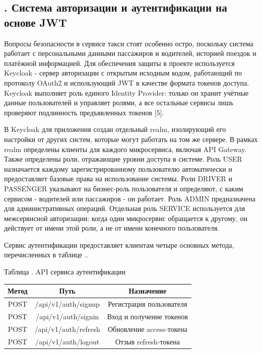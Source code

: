 \subtitlespace

\subsection*{
  \gostTitleFont
  \redline
  \thechaptercntr .\thesubchaptercntr \spc
  Система авторизации и аутентификации на основе JWT
} \addtocounter{subchaptercntr}{1}

\subtitlespace

{\gostFont

  \par \redline Вопросы безопасности в сервисе такси стоят особенно остро, поскольку система работает с персональными данными пассажиров и водителей, историей поездок и платёжной информацией. Для обеспечения защиты в проекте используется Keycloak - сервер авторизации с открытым исходным кодом, работающий по протоколу OAuth2 и использующий JWT в качестве формата токенов доступа. Keycloak выполняет роль единого Identity Provider: только он хранит учётные данные пользователей и управляет ролями, а все остальные сервисы лишь проверяют подлинность предъявленных токенов [5].

  \par \redline В Keycloak для приложения создан отдельный realm, изолирующий его настройки от других систем, которые могут работать на том же сервере. В рамках realm определены клиенты для каждого микросервиса, включая API Gateway. Также определены роли, отражающие уровни доступа в системе. Роль USER назначается каждому зарегистрированному пользователю автоматически и предоставляет базовые права на использование системы. Роли DRIVER и PASSENGER указывают на бизнес-роль пользователя и определяют, с каким сервисом - водителей или пассажиров - он работает. Роль ADMIN предназначена для административных операций. Отдельная роль SERVICE используется для межсервисной авторизации: когда один микросервис обращается к другому, он действует от имени этой роли, а не от имени конечного пользователя.

  \par \redline Сервис аутентификации предоставляет клиентам четыре основных метода, перечисленных в таблице \thechaptercntr .\thetablecntr .

  \topTablespace
  {\begin{Center}
      \par Таблица \thechaptercntr .\thetablecntr \spc {--} API сервиса аутентификации

      \begin{tabular}{|c|c|c|}
        \hline
        Метод & Путь & Назначение \\ \hline
        POST & /api/v1/auth/signup & Регистрация пользователя \\ \hline
        POST & /api/v1/auth/signin & Вход и получение токенов \\ \hline
        POST & /api/v1/auth/refresh & Обновление access-токена \\ \hline
        POST & /api/v1/auth/logout & Отзыв refresh-токена \\ \hline
    \end{tabular} \end{Center}}
  \botTablespace \addtocounter{tablecntr}{1}

}
